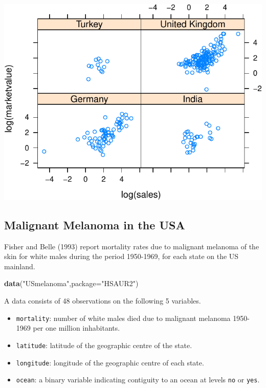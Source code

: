 \documentclass[]{article}
\newenvironment{Shaded}{\begin{snugshade}}{\end{snugshade}}
\newcommand{\KeywordTok}[1]{\textcolor[rgb]{0.13,0.29,0.53}{\textbf{{#1}}}}
\newcommand{\DataTypeTok}[1]{\textcolor[rgb]{0.13,0.29,0.53}{{#1}}}
\newcommand{\StringTok}[1]{\textcolor[rgb]{0.31,0.60,0.02}{{#1}}}
\newcommand{\NormalTok}[1]{{#1}}
\numberwithin{equation}{section}
\begin{document}
\includegraphics{tema1_files/figure-latex/unnamed-chunk-155-1.pdf}

\subsection{Malignant Melanoma in the
USA}\label{malignant-melanoma-in-the-usa}

Fisher and Belle (1993) report mortality rates due to malignant melanoma
of the skin for white males during the period 1950-1969, for each state
on the US mainland.

\begin{Shaded}
\begin{Highlighting}[]
\KeywordTok{data}\NormalTok{(}\StringTok{"USmelanoma"}\NormalTok{,}\DataTypeTok{package=}\StringTok{"HSAUR2"}\NormalTok{)}
\end{Highlighting}
\end{Shaded}

A data consists of 48 observations on the following 5 variables.

\begin{itemize}
\item
  \texttt{mortality}: number of white males died due to malignant
  melanoma 1950-1969 per one million inhabitants.
\item
  \texttt{latitude}: latitude of the geographic centre of the state.
\item
  \texttt{longitude}: longitude of the geographic centre of each state.
\item
  \texttt{ocean}: a binary variable indicating contiguity to an ocean at
  levels \texttt{no} or \texttt{yes}.
\end{itemize}
\end{document}
